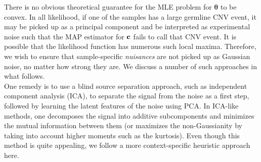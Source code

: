 \documentclass[nofootinbib,amssymb,amsmath]{revtex4}
\newcommand{\vc}{{\bf c}}
\newcommand{\vtheta}{{\boldsymbol \theta}}
\begin{document}
 There is no obvious theoretical guarantee for the MLE problem for $\vtheta$ to be convex. In all likelihood, if one of the samples has a large germline CNV event, it may be picked up as a principal component and be interpreted as experimental noise such that the MAP estimator for $\vc$ fails to call that CNV event. It is possible that the likelihood function has numerous such local maxima. Therefore, we wish to ensure that sample-specific {\em nuisances} are not picked up as Gaussian noise, no matter how strong they are. We discuss a number of such approaches in what follows.\\

 One remedy is to use a blind source separation approach, such as independent component analysis (ICA), to separate the signal from the noise as a first step, followed by learning the latent features of the noise using PCA. In ICA-like methods, one decomposes the signal into additive subcomponents and minimizes the mutual information between them (or maximizes the non-Gaussianity by taking into account higher moments such as the kurtosis). Even though this method is quite appealing, we follow a more context-specific heuristic approach here.\\
\end{document}
